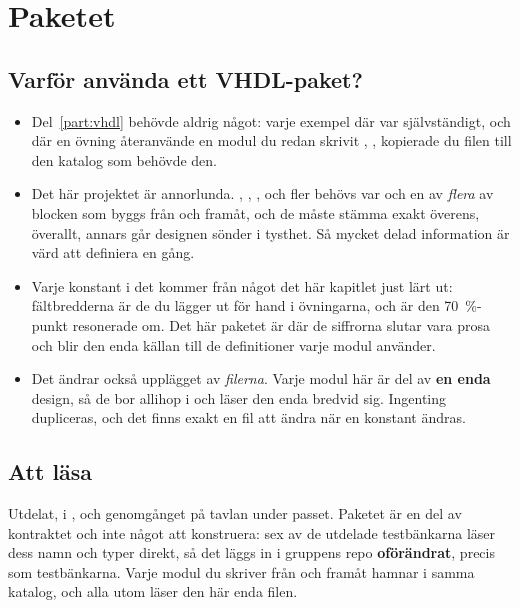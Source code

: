 
\section{Paketet }
\label{c10:sec:candef}

\subsection*{Varför använda ett VHDL-paket?}
\begin{itemize}
  \item Del~\ref{part:vhdl} behövde aldrig något: varje exempel där var självständigt, och där en
    övning återanvände en modul du redan skrivit \textemdash{} ,
    ,  \textemdash{} kopierade du filen till den katalog som behövde
    den.
  \item Det här projektet är annorlunda. , , ,
     och fler behövs var och en av \emph{flera} av blocken som byggs från
     och framåt, och de måste stämma exakt överens, överallt, annars går designen
    sönder i tysthet. Så mycket delad information är värd att definiera en gång.
  \item Varje konstant i det kommer från något det här kapitlet just lärt ut: fältbredderna är de du
    lägger ut för hand i övningarna, och  är den 70~\%-punkt
     resonerade om. Det här paketet är där de siffrorna slutar vara prosa
    och blir den enda källan till de definitioner varje modul använder.
  \item Det ändrar också upplägget av \emph{filerna}. Varje modul här är del av \textbf{en enda}
    design, så de bor allihop i  och läser den enda  bredvid sig.
    Ingenting dupliceras, och det finns exakt en fil att ändra när en konstant ändras.
\end{itemize}

\subsection*{Att läsa }
Utdelat, i , och genomgånget på tavlan under passet. Paketet är en del
av kontraktet och inte något att konstruera: sex av de utdelade testbänkarna läser dess namn och
typer direkt, så det läggs in i gruppens repo \textbf{oförändrat}, precis som testbänkarna. Varje
modul du skriver från  och framåt hamnar i samma katalog, och alla utom
 läser den här enda filen.

